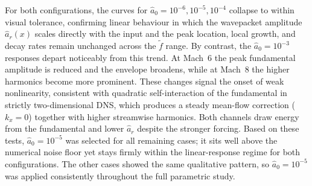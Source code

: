 
For both configurations, the curves for $\hat{a}_0 = 10^{-6}, 10^{-5}, 10^{-4}$ collapse to within visual tolerance, confirming linear behaviour in which the wavepacket amplitude $\hat{a}_r(x)$ scales directly with the input and the peak location, local growth, and decay rates remain unchanged across the $\tilde{f}$ range. By contrast, the $\hat{a}_0 = 10^{-3}$ responses depart noticeably from this trend. At Mach~6 the peak fundamental amplitude is reduced and the envelope broadens, while at Mach~8 the higher harmonics become more prominent. These changes signal the onset of weak nonlinearity, consistent with quadratic self-interaction of the fundamental in strictly two-dimensional \gls{DNS}, which produces a steady mean-flow correction ($k_x = 0$) together with higher streamwise harmonics. Both channels draw energy from the fundamental and lower $\hat{a}_r$ despite the stronger forcing. Based on these tests, $\hat{a}_0 = 10^{-5}$ was selected for all remaining cases; it sits well above the numerical noise floor yet stays firmly within the linear-response regime for both configurations. The other cases showed the same qualitative pattern, so $\hat{a}_0 = 10^{-5}$ was applied consistently throughout the full parametric study.



